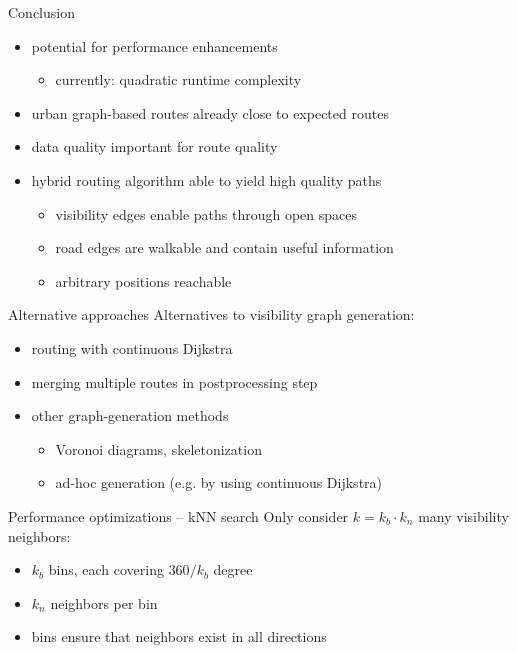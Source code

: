 \documentclass[xcolor={x11names}]{beamer}
\renewcommand{\n}{\hfill\\[0.5ex]}
\newcommand{\startBackupSlides}
{
	\appendix
	\renewcommand*\insertshorttitle
	{
		\makebox[0.94\textwidth]{\oldmacro\hfill Appendix -- (\insertframenumber)\,/\,\inserttotalframenumber}
	}
}
\begin{document}
		\begin{frame}{Conclusion}
			\begin{itemize}
				\item potential for performance enhancements
				\begin{itemize}
					\item currently: quadratic runtime complexity
				\end{itemize}
				\item urban graph-based routes already close to expected routes
				\item data quality important for route quality
				\item hybrid routing algorithm able to yield high quality paths
				\begin{itemize}
					\item visibility edges enable paths through open spaces
					\item road edges are walkable and contain useful information
					\item arbitrary positions reachable
				\end{itemize}
			\end{itemize}
		\end{frame}		
	
	\startBackupSlides
	
	\begin{frame}{Alternative approaches}
		Alternatives to visibility graph generation:\n
		\begin{itemize}
			\item routing with continuous Dijkstra
			\item merging multiple routes in postprocessing step
			\item other graph-generation methods
			\begin{itemize}
				\item Voronoi diagrams, skeletonization
				\item ad-hoc generation (e.g. by using continuous Dijkstra)
			\end{itemize}
		\end{itemize}
	\end{frame}
	
	\begin{frame}{Performance optimizations -- kNN search}
		Only consider $k = k_b \cdot k_n$ many visibility neighbors:
		\begin{itemize}
			\item $k_b$ bins, each covering $360 / k_b$ degree
			\item $k_n$ neighbors per bin
			\item bins ensure that neighbors exist in all directions
		\end{itemize}
	\end{frame}
	
\end{document}
